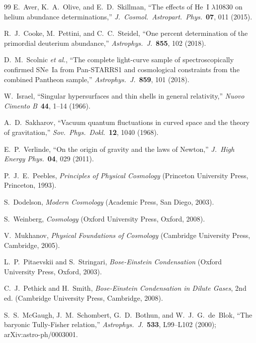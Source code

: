\documentclass[11pt,a4paper]{article}
\theoremstyle{definition}
\theoremstyle{remark}
\begin{document}
\begin{thebibliography}{99}
E.~Aver, K.~A.~Olive, and E.~D.~Skillman, ``The effects of He~I $\lambda$10830 on helium abundance determinations,'' \emph{J.\ Cosmol.\ Astropart.\ Phys.}\ \textbf{07}, 011 (2015).

R.~J.~Cooke, M.~Pettini, and C.~C.~Steidel, ``One percent determination of the primordial deuterium abundance,'' \emph{Astrophys.\ J.}\ \textbf{855}, 102 (2018).

D.~M.~Scolnic \emph{et al.}, ``The complete light-curve sample of spectroscopically confirmed SNe~Ia from Pan-STARRS1 and cosmological constraints from the combined Pantheon sample,'' \emph{Astrophys.\ J.}\ \textbf{859}, 101 (2018).

W.~Israel, ``Singular hypersurfaces and thin shells in general relativity,'' \emph{Nuovo Cimento B}\ \textbf{44}, 1--14 (1966).

A.~D.~Sakharov, ``Vacuum quantum fluctuations in curved space and the theory of gravitation,'' \emph{Sov.\ Phys.\ Dokl.}\ \textbf{12}, 1040 (1968).

E.~P.~Verlinde, ``On the origin of gravity and the laws of Newton,'' \emph{J.\ High Energy Phys.}\ \textbf{04}, 029 (2011).

P.~J.~E.~Peebles, \emph{Principles of Physical Cosmology} (Princeton University Press, Princeton, 1993).

S.~Dodelson, \emph{Modern Cosmology} (Academic Press, San Diego, 2003).

S.~Weinberg, \emph{Cosmology} (Oxford University Press, Oxford, 2008).

V.~Mukhanov, \emph{Physical Foundations of Cosmology} (Cambridge University Press, Cambridge, 2005).

L.~P.~Pitaevskii and S.~Stringari, \emph{Bose-Einstein Condensation} (Oxford University Press, Oxford, 2003).

C.~J.~Pethick and H.~Smith, \emph{Bose-Einstein Condensation in Dilute Gases}, 2nd ed. (Cambridge University Press, Cambridge, 2008).


S.~S.~McGaugh, J.~M.~Schombert, G.~D.~Bothun, and W.~J.~G.~de~Blok,
``The baryonic Tully-Fisher relation,''
\emph{Astrophys.\ J.}\ \textbf{533}, L99--L102 (2000);
arXiv:astro-ph/0003001.


\end{thebibliography}
\end{document}
